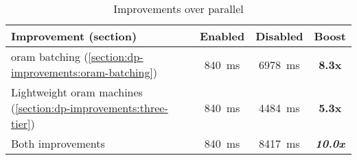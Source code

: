 \begin{table}[!ht]
	\begin{tabular*}{\linewidth}{ !{\extracolsep\fill} l c c >{\bfseries}c } %
		\toprule
			Improvement (section)													& Enabled					& Disabled					& Boost			\\
		\midrule
			\acrshort{oram} batching (\ref{section:dp-improvements:oram-batching})				& \SI{840}{\milli\second}	& \SI{6978}{\milli\second}	& 8.3x			\\
			Lightweight \acrshort{oram} machines (\ref{section:dp-improvements:three-tier})	& \SI{840}{\milli\second}	& \SI{4484}{\milli\second}	& 5.3x			\\
			Both improvements														& \SI{840}{\milli\second}	& \SI{8417}{\milli\second}	& \emph{10.0x}	\\
		\bottomrule
	\end{tabular*}
	\caption{Improvements over parallel \epsolute{}}%
	\label{table:optimizations}
\end{table}
